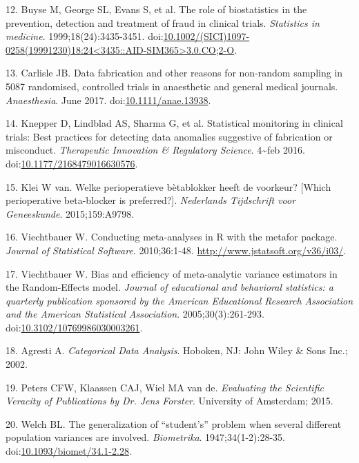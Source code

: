 \documentclass[]{article}
\begin{document}
\hypertarget{ref-Buyse1999-jq}{}
12. Buyse M, George SL, Evans S, et al. The role of biostatistics in the
prevention, detection and treatment of fraud in clinical trials.
\emph{Statistics in medicine}. 1999;18(24):3435-3451.
doi:\href{https://doi.org/10.1002/(SICI)1097-0258(19991230)18:24\%3C3435::AID-SIM365\%3E3.0.CO;2-O}{10.1002/(SICI)1097-0258(19991230)18:24\textless{}3435::AID-SIM365\textgreater{}3.0.CO;2-O}.

\hypertarget{ref-10.1111ux2fanae.13938}{}
13. Carlisle JB. Data fabrication and other reasons for non-random
sampling in 5087 randomised, controlled trials in anaesthetic and
general medical journals. \emph{Anaesthesia}. June 2017.
doi:\href{https://doi.org/10.1111/anae.13938}{10.1111/anae.13938}.

\hypertarget{ref-Knepper2016-la}{}
14. Knepper D, Lindblad AS, Sharma G, et al. Statistical monitoring in
clinical trials: Best practices for detecting data anomalies suggestive
of fabrication or misconduct. \emph{Therapeutic Innovation \& Regulatory
Science}. 4\textasciitilde{}feb 2016.
doi:\href{https://doi.org/10.1177/2168479016630576}{10.1177/2168479016630576}.

\hypertarget{ref-klei2015}{}
15. Klei W van. Welke perioperatieve bètablokker heeft de voorkeur?
{[}Which perioperative beta-blocker is preferred?{]}. \emph{Nederlands
Tijdschrift voor Geneeskunde}. 2015;159:A9798.

\hypertarget{ref-viechtbauer2010}{}
16. Viechtbauer W. Conducting meta-analyses in R with the metafor
package. \emph{Journal of Statistical Software}. 2010;36:1-48.
\url{http://www.jstatsoft.org/v36/i03/}.

\hypertarget{ref-viechtbauer2005}{}
17. Viechtbauer W. Bias and efficiency of meta-analytic variance
estimators in the Random-Effects model. \emph{Journal of educational and
behavioral statistics: a quarterly publication sponsored by the American
Educational Research Association and the American Statistical
Association}. 2005;30(3):261-293.
doi:\href{https://doi.org/10.3102/10769986030003261}{10.3102/10769986030003261}.

\hypertarget{ref-agresti2002}{}
18. Agresti A. \emph{Categorical Data Analysis}. Hoboken, NJ: John Wiley
\& Sons Inc.; 2002.

\hypertarget{ref-peters2015}{}
19. Peters CFW, Klaassen CAJ, Wiel MA van de. \emph{Evaluating the
Scientific Veracity of Publications by Dr. Jens Forster}. University of
Amsterdam; 2015.

\hypertarget{ref-doi:10.1093ux2fbiometux2f34.1-2.28}{}
20. Welch BL. The generalization of ``student's'' problem when several
different population variances are involved. \emph{Biometrika}.
1947;34(1-2):28-35.
doi:\href{https://doi.org/10.1093/biomet/34.1-2.28}{10.1093/biomet/34.1-2.28}.
\end{document}
